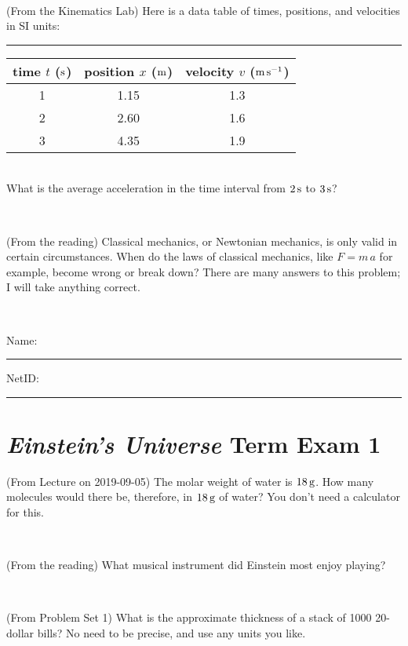 \documentclass[12pt, letterpaper]{article}
\begin{document}
\vfill ~

\begin{problem} (From the Kinematics Lab)
Here is a data table of times, positions, and velocities in SI units:\\
\rule{1.0in}{0pt}\begin{tabular}{c|c|c}
time $t$ ($\mathrm{s}$) & position $x$ ($\mathrm{m}$) & velocity $v$ ($\mathrm{m}\,\mathrm{s}^{-1}$) \\
\hline
1 & 1.15 & 1.3 \\
2 & 2.60 & 1.6 \\
3 & 4.35 & 1.9 \\
\hline
\end{tabular}\\
What is the average acceleration in the time interval from $2\,\mathrm{s}$ to $3\,\mathrm{s}$?
\end{problem}


\vfill ~

\begin{problem} (From the reading)
Classical mechanics, or Newtonian mechanics, is only valid in certain
circumstances. When do the laws of classical mechanics, like $F =
m\,a$ for example, become wrong or break down? There are many answers
to this problem; I will take anything correct.
\end{problem}


\vfill ~


\cleardoublepage



\noindent
Name: \rule[-1ex]{0.60\textwidth}{0.1pt}
NetID: \rule[-1ex]{0.20\textwidth}{0.1pt}

\section*{\textsl{Einstein's Universe} Term Exam 1}
\setcounter{problem}{1}


\begin{problem} (From Lecture on 2019-09-05)
The molar weight of water is $18\,\mathrm{g}$. How many molecules would there
be, therefore, in $18\,\mathrm{g}$ of water? You don't need a calculator for
this.
\end{problem}


\vfill ~

\begin{problem} (From the reading)
What musical instrument did Einstein most enjoy playing?
\end{problem}


\vfill ~

\begin{problem} (From Problem Set 1)
What is the approximate thickness of a stack of 1000 20-dollar bills?
No need to be precise, and use any units you like.
\end{problem}
\end{document}
